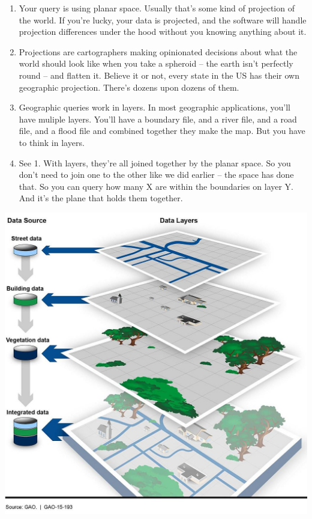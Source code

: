 \documentclass[]{book}
\providecommand{\tightlist}{%
  \setlength{\itemsep}{0pt}\setlength{\parskip}{0pt}}
\begin{document}
\begin{enumerate}
\def\labelenumi{\arabic{enumi}.}
\tightlist
\item
  Your query is using planar space. Usually that's some kind of projection of the world. If you're lucky, your data is projected, and the software will handle projection differences under the hood without you knowing anything about it.
\item
  Projections are cartographers making opinionated decisions about what the world should look like when you take a spheroid -- the earth isn't perfectly round -- and flatten it. Believe it or not, every state in the US has their own geographic projection. There's dozens upon dozens of them.
\item
  Geographic queries work in layers. In most geographic applications, you'll have muliple layers. You'll have a boundary file, and a river file, and a road file, and a flood file and combined together they make the map. But you have to think in layers.
\item
  See 1. With layers, they're all joined together by the planar space. So you don't need to join one to the other like we did earlier -- the space has done that. So you can query how many X are within the boundaries on layer Y. And it's the plane that holds them together.
\end{enumerate}

\includegraphics[width=14.22in]{images/geolayers}
\end{document}
